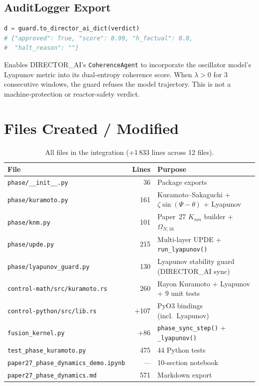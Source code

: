 \documentclass[11pt,a4paper]{article}
\begin{document}
\subsection{AuditLogger Export}

\begin{lstlisting}[language=Python]
d = guard.to_director_ai_dict(verdict)
# {"approved": True, "score": 0.99, "h_factual": 0.0,
#  "halt_reason": ""}
\end{lstlisting}

Enables DIRECTOR\_AI's \texttt{CoherenceAgent} to incorporate the oscillator
model's Lyapunov metric into its dual-entropy coherence score. When
$\lambda > 0$ for 3 consecutive windows, the guard refuses the model
trajectory. This is not a machine-protection or reactor-safety verdict.


\section{Files Created / Modified}

\begin{table}[h]
\centering
\small
\begin{tabular}{@{}lrl@{}}
\toprule
\textbf{File} & \textbf{Lines} & \textbf{Purpose} \\
\midrule
\texttt{phase/\_\_init\_\_.py} & 36 & Package exports \\
\texttt{phase/kuramoto.py} & 161 & Kuramoto--Sakaguchi + $\zeta\sin(\Psi-\theta)$ + Lyapunov \\
\texttt{phase/knm.py} & 101 & Paper~27 $K_{nm}$ builder + $\Omega_{N,16}$ \\
\texttt{phase/upde.py} & 215 & Multi-layer UPDE + \texttt{run\_lyapunov()} \\
\texttt{phase/lyapunov\_guard.py} & 130 & Lyapunov stability guard (DIRECTOR\_AI sync) \\
\texttt{control-math/src/kuramoto.rs} & 260 & Rayon Kuramoto + Lyapunov + 9 unit tests \\
\texttt{control-python/src/lib.rs} & +107 & PyO3 bindings (incl.\ Lyapunov) \\
\texttt{fusion\_kernel.py} & +86 & \texttt{phase\_sync\_step()} + \texttt{\_lyapunov()} \\
\texttt{test\_phase\_kuramoto.py} & 475 & 44 Python tests \\
\texttt{paper27\_phase\_dynamics\_demo.ipynb} & --- & 10-section notebook \\
\texttt{paper27\_phase\_dynamics.md} & 571 & Markdown export \\
\bottomrule
\end{tabular}
\caption{All files in the integration (+1\,833 lines across 12 files).}
\end{table}
\end{document}
